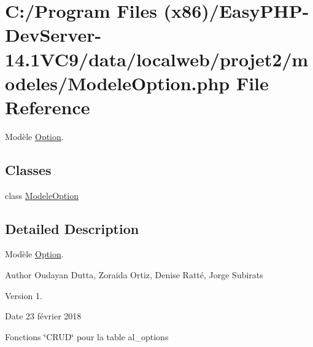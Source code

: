 \hypertarget{_modele_option_8php}{}\section{C\+:/\+Program Files (x86)/\+Easy\+P\+H\+P-\/\+Dev\+Server-\/14.1\+V\+C9/data/localweb/projet2/modeles/\+Modele\+Option.php File Reference}
\label{_modele_option_8php}


Modèle \hyperlink{class_option}{Option}.  


\subsection*{Classes}
\begin{DoxyCompactItemize}
\item 
class \hyperlink{class_modele_option}{Modele\+Option}
\end{DoxyCompactItemize}


\subsection{Detailed Description}
Modèle \hyperlink{class_option}{Option}. 

\begin{DoxyAuthor}{Author}
Oudayan Dutta, Zoraida Ortiz, Denise Ratté, Jorge Subirats 
\end{DoxyAuthor}
\begin{DoxyVersion}{Version}
1. 
\end{DoxyVersion}
\begin{DoxyDate}{Date}
23 février 2018
\end{DoxyDate}
Fonctions \char`\"{}\+C\+R\+U\+D\char`\"{} pour la table al\+\_\+options 